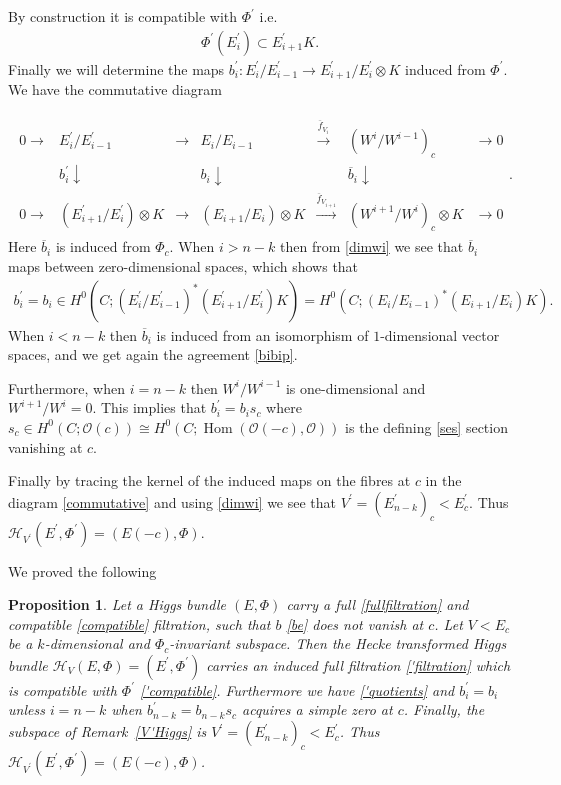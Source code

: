 \documentclass[12pt]{article}
\numberwithin{equation}{section}
\newtheorem{proposition}[theorem]{Proposition}
\theoremstyle{remark}
\theoremstyle{definition}
\numberwithin{theorem}{section}
\def\beq{\begin{eqnarray}}
\def\eeq{\end{eqnarray}}
\def\bes{\begin{eqnarray*}}
\def\ees{\end{eqnarray*}}
\DeclareMathOperator{\Hom}{Hom}
\def\calH{\mathcal{H}}
\def\calO{{\mathcal O}}
\renewcommand{\1}{\mathbbm{1}}
\begin{document}
By construction it is compatible with $\Phi^\prime$ i.e.  \beq \label{'compatible}\Phi^\prime(E^\prime_i)\subset E^\prime_{i+1}K.\eeq Finally we will determine the maps $b^\prime_i:E^\prime_i/E^\prime_{i-1}\to E^\prime_{i+1}/E^\prime_i\otimes K$ induced from $\Phi^\prime$. We have the commutative diagram

\bes \begin{array}{ccccccc}   0\to & E_{i}^\prime/E^\prime_{i-1}&\to &E_{i}/E_{i-1}& \stackrel{\overline{f}_{V_{i}}}{\to} &(W^{i}/W^{i-1})_c&\to 0 \\ &b_i^\prime \downarrow &&b_i \downarrow &&\overline{b}_i\downarrow & \\   0\to & (E_{i+1}^\prime/E^\prime_i)\otimes K&\to &(E_{i+1}/E_i)\otimes K& \stackrel{\overline{f}_{V_{i+1}}}{\to} &(W^{i+1}/W^i)_c\otimes K&\to 0
\end{array}.\ees Here $\overline{b}_i$ is induced from $\Phi_c$. When $i>n-k$ then from \eqref{dimwi} we see that $\overline{b}_i$ maps between zero-dimensional spaces, which shows that \beq \label{bibip}b_i^\prime=b_i\in H^0(C;(E_{i}^\prime/E^\prime_{i-1})^*(E_{i+1}^\prime/E^\prime_i)K)=H^0(C;(E_{i}/E_{i-1})^*(E_{i+1}/E_i)K).
\eeq
When $i<n-k$ then $\overline{b}_i$ is induced from an isomorphism of $1$-dimensional vector spaces, and we get again the agreement \eqref{bibip}. 

Furthermore, when $i=n-k$ then $W^{i}/W^{i-1}$ is one-dimensional and $W^{i+1}/W^i=0$. This implies that $b_i^\prime=b_i s_c$ where $s_c\in H^0(C;\calO(c))\cong H^0(C;\Hom(\calO(-c), \calO))$ is the defining \eqref{ses} section vanishing at $c$. 

Finally by tracing the kernel of the induced maps on the fibres at $c$ in the diagram \eqref{commutative} and using \eqref{dimwi} we see that $V^\prime=(E^\prime_{n-k})_c<E^\prime_c$. Thus $\calH_{V^\prime}(E^\prime,\Phi^\prime)=(E(-c),\Phi )$.

We proved the following

\begin{proposition} \label{modifiedfilt}Let a Higgs bundle $(E,\Phi)$ carry a full \eqref{fullfiltration} and compatible \eqref{compatible} filtration, such that $b$ \eqref{be} does not vanish at $c$. Let $V<E_c$ be a  $k$-dimensional and $\Phi_c$-invariant subspace. Then the Hecke transformed Higgs bundle $\calH_V(E,\Phi)=(E^\prime,\Phi^\prime)$ carries an induced full filtration \eqref{'filtration} which is compatible with $\Phi^\prime$ \eqref{'compatible}. Furthermore we have \eqref{'quotients} and $b^\prime_i=b_i$ unless $i=n-k$ when $b^\prime_{n-k}=b_{n-k}s_c$ acquires a simple zero at $c$. Finally, the subspace of Remark~\ref{V'Higgs} is  $V^\prime=(E^\prime_{n-k})_c<E^\prime_c$. Thus $\calH_{V^\prime}(E^\prime,\Phi^\prime)=(E(-c),\Phi )$. 
\end{proposition}
\end{document}
